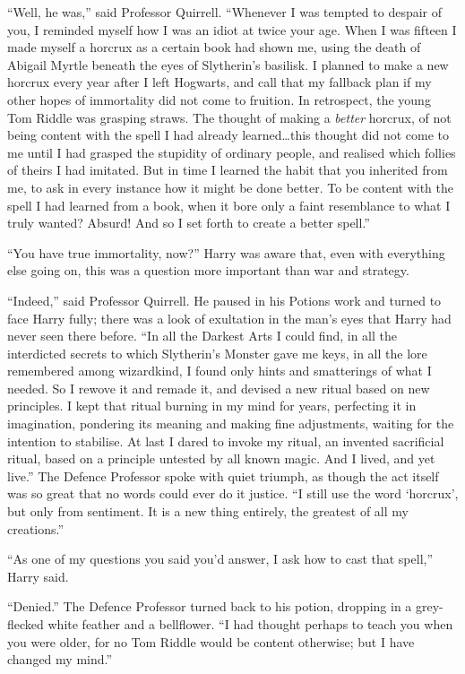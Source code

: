 “Well, he was,” said Professor Quirrell. “Whenever I was tempted to despair of you, I reminded myself how I was an idiot at twice your age. When I was fifteen I made myself a horcrux as a certain book had shown me, using the death of Abigail Myrtle beneath the eyes of Slytherin’s basilisk. I planned to make a new horcrux every year after I left Hogwarts, and call that my fallback plan if my other hopes of immortality did not come to fruition. In retrospect, the young Tom Riddle was grasping straws. The thought of making a \emph{better} horcrux, of not being content with the spell I had already learned…this thought did not come to me until I had grasped the stupidity of ordinary people, and realised which follies of theirs I had imitated. But in time I learned the habit that you inherited from me, to ask in every instance how it might be done better. To be content with the spell I had learned from a book, when it bore only a faint resemblance to what I truly wanted? Absurd! And so I set forth to create a better spell.”

“You have true immortality, now?” Harry was aware that, even with everything else going on, this was a question more important than war and strategy.

“Indeed,” said Professor Quirrell. He paused in his Potions work and turned to face Harry fully; there was a look of exultation in the man’s eyes that Harry had never seen there before. “In all the Darkest Arts I could find, in all the interdicted secrets to which Slytherin’s Monster gave me keys, in all the lore remembered among wizardkind, I found only hints and smatterings of what I needed. So I rewove it and remade it, and devised a new ritual based on new principles. I kept that ritual burning in my mind for years, perfecting it in imagination, pondering its meaning and making fine adjustments, waiting for the intention to stabilise. At last I dared to invoke my ritual, an invented sacrificial ritual, based on a principle untested by all known magic. And I lived, and yet live.” The Defence Professor spoke with quiet triumph, as though the act itself was so great that no words could ever do it justice. “I still use the word ‘horcrux’, but only from sentiment. It is a new thing entirely, the greatest of all my creations.”

“As one of my questions you said you’d answer, I ask how to cast that spell,” Harry said.

“Denied.” The Defence Professor turned back to his potion, dropping in a grey-flecked white feather and a bellflower. “I had thought perhaps to teach you when you were older, for no Tom Riddle would be content otherwise; but I have changed my mind.”

